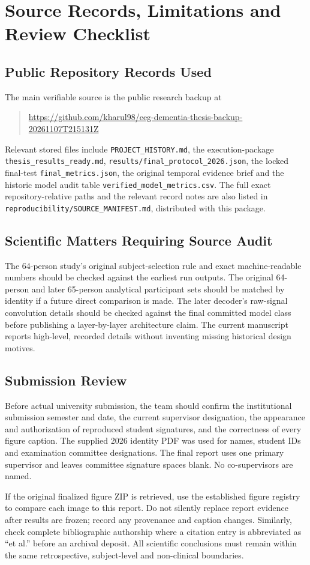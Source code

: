 \chapter{Source Records, Limitations and Review Checklist}
\label{app:sources}
\section{Public Repository Records Used}
The main verifiable source is the public research backup at
\begin{quote}\small\url{https://github.com/kharul98/eeg-dementia-thesis-backup-20261107T215131Z}\end{quote}
Relevant stored files include \texttt{PROJECT\_HISTORY.md}, the execution-package \texttt{thesis\_results\_ready.md}, \texttt{results/final\_protocol\_2026.json}, the locked final-test \texttt{final\_metrics.json}, the original temporal evidence brief and the historic model audit table \texttt{verified\_model\_metrics.csv}. The full exact repository-relative paths and the relevant record notes are also listed in \texttt{reproducibility/SOURCE\_MANIFEST.md}, distributed with this package.

\section{Scientific Matters Requiring Source Audit}
The 64-person study's original subject-selection rule and exact machine-readable numbers should be checked against the earliest run outputs. The original 64-person and later 65-person analytical participant sets should be matched by identity if a future direct comparison is made. The later decoder's raw-signal convolution details should be checked against the final committed model class before publishing a layer-by-layer architecture claim. The current manuscript reports high-level, recorded details without inventing missing historical design motives.

\section{Submission Review}
Before actual university submission, the team should confirm the institutional submission semester and date, the current supervisor designation, the appearance and authorization of reproduced student signatures, and the correctness of every figure caption. The supplied 2026 identity PDF was used for names, student IDs and examination committee designations. The final report uses one primary supervisor and leaves committee signature spaces blank. No co-supervisors are named.

If the original finalized figure ZIP is retrieved, use the established figure registry to compare each image to this report. Do not silently replace report evidence after results are frozen; record any provenance and caption changes. Similarly, check complete bibliographic authorship where a citation entry is abbreviated as ``et al.'' before an archival deposit. All scientific conclusions must remain within the same retrospective, subject-level and non-clinical boundaries.
